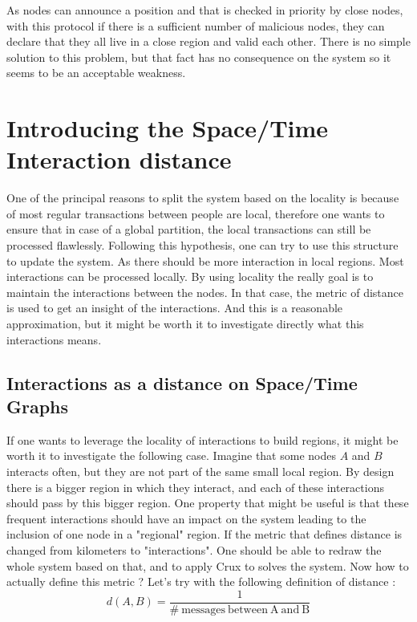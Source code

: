 \documentclass[a4paper,11pt,oneside]{report}
\begin{document}
As nodes can announce a position and that is checked in priority by close
nodes, with this protocol if there is a sufficient number of malicious nodes,
they can declare that they all live in a close region and valid each other.
There is no simple solution to this problem, but that fact has no consequence
on the system so it seems to be an acceptable weakness.

\section{Introducing the Space/Time Interaction distance}
One of the principal reasons to split the system based on the locality is
because of most regular transactions between people are local, therefore one
wants to ensure that in case of a global partition, the local transactions can
still be processed flawlessly. Following this hypothesis, one can try to use
this structure to update the system. As there should be more interaction in
local regions. Most interactions can be processed locally. By using locality
the really goal is to maintain the interactions between the nodes. In that
case, the metric of distance is used to get an insight of the interactions. And
this is a reasonable approximation, but it might be worth it to investigate
directly what this interactions means. 

\subsection{Interactions as a distance on Space/Time Graphs}

If one wants to leverage the locality of interactions to build regions, it
might be worth it to investigate the following case.  Imagine that some nodes
$A$ and $B$ interacts often, but they are not part of the same small local
region.  By design there is a bigger region in which they interact, and each of
these interactions should pass by this bigger region. One property that might
be useful is that these frequent interactions should have an impact on the
system leading to the inclusion of one node in a "regional" region. If the
metric that defines distance is changed from kilometers to "interactions". One
should be able to redraw the whole system based on that, and to apply Crux to
solves the system. Now how to actually define this metric ? Let's try with the
following definition of distance : \begin{equation} \label{definition-distance}
    d(A,B) = \frac{1}{ \mathrm{\#\ messages\ between\ A\ and\ B} } 
\end{equation}
\end{document}
